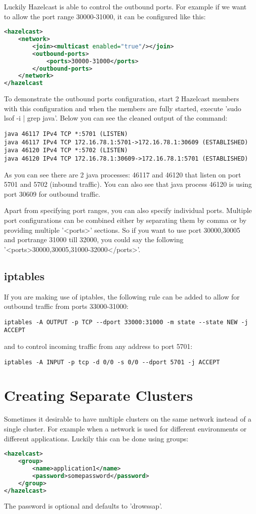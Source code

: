 Luckily Hazelcast is able to control the outbound ports. For example if we want to allow the port range 30000-31000, it can be configured like this:
\begin{lstlisting}[language=xml]
<hazelcast>
    <network>
        <join><multicast enabled="true"/></join>
        <outbound-ports>
            <ports>30000-31000</ports>
        </outbound-ports>
    </network>
</hazelcast
\end{lstlisting}
To demonstrate the outbound ports configuration, start 2 Hazelcast members with this configuration and when the members are fully started, execute 'sudo lsof -i | grep java'. Below you can see the cleaned output of the command:
\begin{lstlisting}
java 46117 IPv4 TCP *:5701 (LISTEN)
java 46117 IPv4 TCP 172.16.78.1:5701->172.16.78.1:30609 (ESTABLISHED)
java 46120 IPv4 TCP *:5702 (LISTEN)
java 46120 IPv4 TCP 172.16.78.1:30609->172.16.78.1:5701 (ESTABLISHED)
\end{lstlisting}
As you can see there are 2 java processes: 46117 and 46120 that listen on port 5701 and 5702 (inbound traffic). You can also see that java process 46120 is using port 30609 for outbound traffic.

Apart from specifying port ranges, you can also specify individual ports. Multiple port configurations can be combined either by separating them by comma or by providing multiple '<ports>' sections. So if you want to use port 30000,30005 and portrange 31000 till 32000, you could say the following '<ports>30000,30005,31000-32000</ports>'. 

\subsection{iptables}
If you are making use of iptables, the following rule can be added to allow for outbound traffic from ports 33000-31000:
\begin{lstlisting}
iptables -A OUTPUT -p TCP --dport 33000:31000 -m state --state NEW -j ACCEPT
\end{lstlisting}
and to control incoming traffic from any address to port 5701:
\begin{lstlisting}
iptables -A INPUT -p tcp -d 0/0 -s 0/0 --dport 5701 -j ACCEPT
\end{lstlisting}

\section{Creating Separate Clusters}
Sometimes it desirable to have multiple clusters on the same network instead of a single cluster. For example when a network is used for different environments or different applications. Luckily this can be done using groups:
\begin{lstlisting}[language=xml]
<hazelcast>
    <group>
        <name>application1</name>
        <password>somepassword</password>
    </group>
</hazelcast>
\end{lstlisting}
The password is optional and defaults to 'drowssap'.

